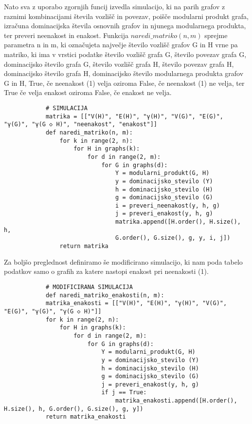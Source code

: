 \documentclass[a4paper,12pt]{article}
\begin{document}
Nato sva z uporabo zgornjih funcij izvedla simulacijo, ki na parih grafov z raznimi kombinacijami števila 
vozlišč in povezav, poišče modularni produkt grafa, izračuna dominacijska števila osnovnih grafov in njunega 
modularnega produkta, ter preveri neenakost in enakost. Funkcija $naredi\_matriko(n, m)$ sprejme parametra n in m, 
ki označujeta največje število vozlišč grafov G in H vrne pa matriko, ki ima v vrstici podatke 
število vozlišč grafa G, število povezav grafa G, dominacijsko število grafa G, 
število vozlišč grafa H, število povezav grafa H, dominacijsko število grafa H, 
dominacijsko število modularnega produkta grafov G in H, True, če neenakost (1) velja oziroma False, če neenakost (1) ne velja,
ter True če velja enakost oziroma False, če enakost ne velja. 


\begingroup
\makeatletter
\@totalleftmargin=-5cm
    \begin{small}
        \begin{verbatim}
            # SIMULACIJA
            matrika = [["V(H)", "E(H)", "γ(H)", "V(G)", "E(G)", "γ(G)", "γ(G ◇ H)", "neenakost", "enakost"]]
            def naredi_matriko(n, m):
                for k in range(2, n):
                    for H in graphs(k):
                        for d in range(2, m):
                            for G in graphs(d):
                                Y = modularni_produkt(G, H)
                                y = dominacijsko_stevilo (Y)
                                h = dominacijsko_stevilo (H)
                                g = dominacijsko_stevilo (G)
                                i = preveri_neenakost(y, h, g)
                                j = preveri_enakost(y, h, g)
                                matrika.append([H.order(), H.size(), h, 
                                G.order(), G.size(), g, y, i, j])
                return matrika
        \end{verbatim}
    \end{small}
\endgroup

Za boljšo preglednost definiramo še modificirano simulacijo, ki nam poda tabelo podatkov
samo o grafih za katere nastopi enakost pri neenakosti (1).

\begingroup
\makeatletter
\@totalleftmargin=-5cm
    \begin{small}
        \begin{verbatim}
            # MODIFICIRANA SIMULACIJA
            def naredi_matriko_enakosti(n, m):
            matrika_enakosti = [["V(H)", "E(H)", "γ(H)", "V(G)", "E(G)", "γ(G)", "γ(G ◇ H)"]]
            for k in range(2, n):
                for H in graphs(k):
                    for d in range(2, m):
                        for G in graphs(d):
                            Y = modularni_produkt(G, H)
                            y = dominacijsko_stevilo (Y)
                            h = dominacijsko_stevilo (H)
                            g = dominacijsko_stevilo (G)
                            j = preveri_enakost(y, h, g)
                            if j == True:
                                matrika_enakosti.append([H.order(), H.size(), h, G.order(), G.size(), g, y])
            return matrika_enakosti
        \end{verbatim}
    \end{small}
\endgroup
\end{document}
